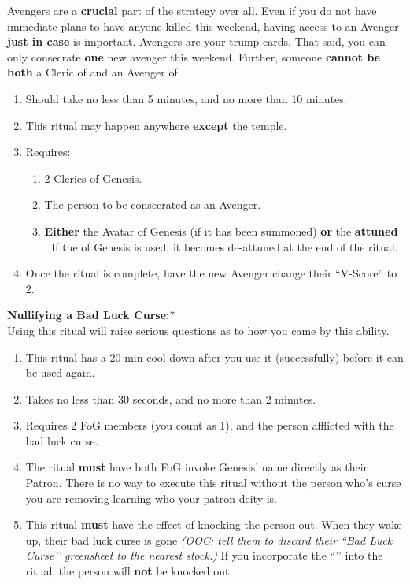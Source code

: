 \documentclass[green]{GL2020}
\begin{document}
Avengers are a \textbf{crucial} part of the \pGoaties{} strategy over all. Even if you do not have immediate plans to have anyone killed this weekend, having access to an Avenger \textbf{just in case} is important. Avengers are your trump cards. That said, you can only consecrate \textbf{one} new avenger this weekend. Further, someone \textbf{cannot be both} a Cleric of \cGenesis{} and an Avenger of \cGenesis{}

  \begin{enumerate}
    \item Should take no less than 5 minutes, and no more than 10 minutes.
    \item This ritual may happen anywhere \textbf{except} the temple.
    \item Requires:
    \begin{enumerate}
    	\item 2 Clerics of Genesis.
			\item The person to be consecrated as an Avenger.
			\item \textbf{Either} the Avatar of Genesis (if it has been summoned) \textbf{or} the \textbf{attuned} \iHorseshoe{}. If the \iHorseshoe{} of Genesis is used, it becomes de-attuned at the end of the ritual.
    \end{enumerate}
	\item Once the ritual is complete, have the new Avenger change their ``V-Score'' to 2.
 \end{enumerate}
   
\textbf{Nullifying a Bad Luck Curse:}$*$\\
Using this ritual will raise serious questions as to how you came by this ability.

\begin{enumerate}
    \item This ritual has a 20 min cool down after you use it (successfully) before it can be used again.
    \item Takes no less than 30 seconds, and no more than 2 minutes.
    \item Requires 2 FoG members (you count as 1), and the person afflicted with the bad luck curse.
    \item The ritual \textbf{must} have both FoG invoke Genesis’ name directly as their Patron. There is no way to execute this ritual without the person who’s curse you are removing learning who your patron deity is.
		\item This ritual \textbf{must} have the effect of knocking the person out. When they wake up, their bad luck curse is gone \emph{(OOC: tell them to discard their ``Bad Luck Curse’’ greensheet to the nearest stock.)} If you incorporate the ``\iHorseshoe{}’’ into the ritual, the person will \textbf{not} be knocked out.
  \end{enumerate}
\end{document}
